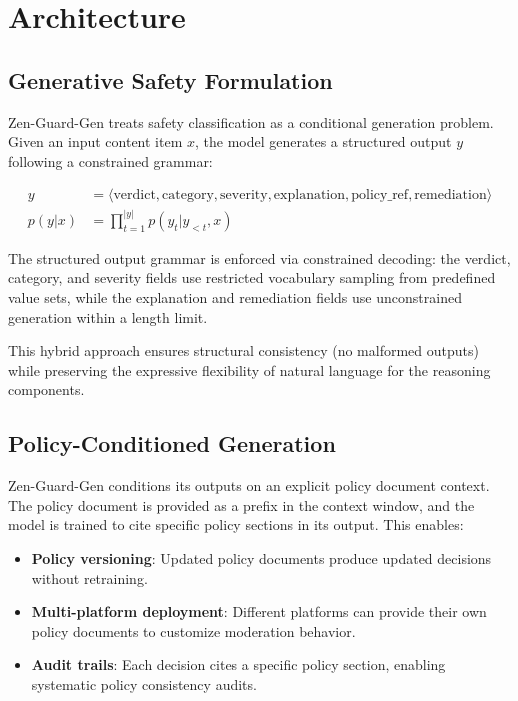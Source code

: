 \documentclass[11pt,a4paper]{article}
\begin{document}
\section{Architecture}

\subsection{Generative Safety Formulation}

Zen-Guard-Gen treats safety classification as a conditional generation problem. Given an input content item $x$, the model generates a structured output $y$ following a constrained grammar:

\begin{align}
  y &= \langle \text{verdict}, \text{category}, \text{severity}, \text{explanation}, \text{policy\_ref}, \text{remediation} \rangle \\
  p(y | x) &= \prod_{t=1}^{|y|} p(y_t | y_{<t}, x)
\end{align}

The structured output grammar is enforced via constrained decoding: the verdict, category, and severity fields use restricted vocabulary sampling from predefined value sets, while the explanation and remediation fields use unconstrained generation within a length limit.

This hybrid approach ensures structural consistency (no malformed outputs) while preserving the expressive flexibility of natural language for the reasoning components.

\subsection{Policy-Conditioned Generation}

Zen-Guard-Gen conditions its outputs on an explicit policy document context. The policy document is provided as a prefix in the context window, and the model is trained to cite specific policy sections in its output. This enables:

\begin{itemize}
  \item \textbf{Policy versioning}: Updated policy documents produce updated decisions without retraining.
  \item \textbf{Multi-platform deployment}: Different platforms can provide their own policy documents to customize moderation behavior.
  \item \textbf{Audit trails}: Each decision cites a specific policy section, enabling systematic policy consistency audits.
\end{itemize}
\end{document}
